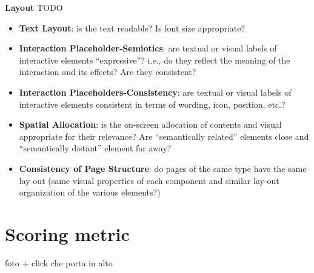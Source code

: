 \textbf{Layout} TODO
\begin{itemize}
\item \textbf{Text Layout}: is the text readable? Is font size appropriate?
\item \textbf{Interaction Placeholder-Semiotics}: are textual or visual labels of interactive elements “expressive”? i.e., do they reflect the meaning of the interaction and its effects? Are they consistent?
\item \textbf{Interaction Placeholders-Consistency}: are textual or visual labels of interactive elements consistent in terms of wording, icon, position, etc.?
\item \textbf{Spatial Allocation}: is the on-screen allocation of contents and visual appropriate for their relevance? Are “semantically related” elements close and “semantically distant” element far away?
\item \textbf{Consistency of Page Structure}: do pages of the same type have the same lay out (same visual properties of each component and similar lay-out organization of the various elements?)
\end{itemize} 


\section{Scoring metric}




foto + click che porta in alto